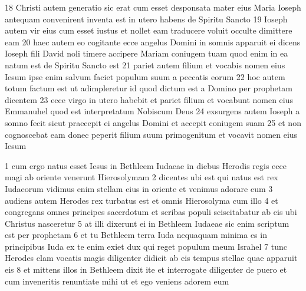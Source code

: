18 Christi autem generatio sic erat cum esset desponsata mater eius Maria Ioseph antequam convenirent inventa est in utero habens de Spiritu Sancto  19 Ioseph autem vir eius cum esset iustus et nollet eam traducere voluit occulte dimittere eam  20 haec autem eo cogitante ecce angelus Domini in somnis apparuit ei dicens Ioseph fili David noli timere accipere Mariam coniugem tuam quod enim in ea natum est de Spiritu Sancto est  21 pariet autem filium et vocabis nomen eius Iesum ipse enim salvum faciet populum suum a peccatis eorum  22 hoc autem totum factum est ut adimpleretur id quod dictum est a Domino per prophetam dicentem  23 ecce virgo in utero habebit et pariet filium et vocabunt nomen eius Emmanuhel quod est interpretatum Nobiscum Deus  24 exsurgens autem Ioseph a somno fecit sicut praecepit ei angelus Domini et accepit coniugem suam  25 et non cognoscebat eam donec peperit filium suum primogenitum et vocavit nomen eius Iesum


  1 cum ergo natus esset Iesus in Bethleem Iudaeae in diebus Herodis regis ecce magi ab oriente venerunt Hierosolymam  2 dicentes ubi est qui natus est rex Iudaeorum vidimus enim stellam eius in oriente et venimus adorare eum  3 audiens autem Herodes rex turbatus est et omnis Hierosolyma cum illo  4 et congregans omnes principes sacerdotum et scribas populi sciscitabatur ab eis ubi Christus nasceretur  5 at illi dixerunt ei in Bethleem Iudaeae sic enim scriptum est per prophetam  6 et tu Bethleem terra Iuda nequaquam minima es in principibus Iuda ex te enim exiet dux qui reget populum meum Israhel  7 tunc Herodes clam vocatis magis diligenter didicit ab eis tempus stellae quae apparuit eis  8 et mittens illos in Bethleem dixit ite et interrogate diligenter de puero et cum inveneritis renuntiate mihi ut et ego veniens adorem eum

